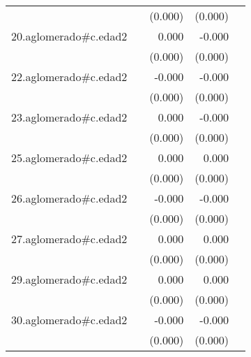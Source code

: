 {\begin{longtable}{l*{4}{D{.}{.}{-1}}}
            &                     &     (0.000)         &     (0.000)         &                     \\
\addlinespace
20.aglomerado#c.edad2&                     &       0.000         &      -0.000         &                     \\
            &                     &     (0.000)         &     (0.000)         &                     \\
\addlinespace
22.aglomerado#c.edad2&                     &      -0.000         &      -0.000\sym{**} &                     \\
            &                     &     (0.000)         &     (0.000)         &                     \\
\addlinespace
23.aglomerado#c.edad2&                     &       0.000         &      -0.000         &                     \\
            &                     &     (0.000)         &     (0.000)         &                     \\
\addlinespace
25.aglomerado#c.edad2&                     &       0.000\sym{*}  &       0.000         &                     \\
            &                     &     (0.000)         &     (0.000)         &                     \\
\addlinespace
26.aglomerado#c.edad2&                     &      -0.000         &      -0.000\sym{*}  &                     \\
            &                     &     (0.000)         &     (0.000)         &                     \\
\addlinespace
27.aglomerado#c.edad2&                     &       0.000\sym{*}  &       0.000         &                     \\
            &                     &     (0.000)         &     (0.000)         &                     \\
\addlinespace
29.aglomerado#c.edad2&                     &       0.000\sym{**} &       0.000         &                     \\
            &                     &     (0.000)         &     (0.000)         &                     \\
\addlinespace
30.aglomerado#c.edad2&                     &      -0.000         &      -0.000\sym{***}&                     \\
            &                     &     (0.000)         &     (0.000)         &                     \\

\end{longtable}}
